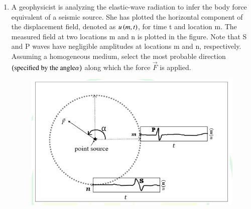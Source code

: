 \documentclass[journal,12pt,onecolumn]{IEEEtran}
\theoremstyle{remark}
\begin{document}
\begin{enumerate}
\item A geophysicist is analyzing the elastic-wave radiation to infer the body force equivalent of a seismic source. She has plotted the horizontal component of the displacement field, denoted as $u\left(m,t\right)$, for time t and location m. The measured field at two locations m and n is plotted in the figure. Note that S and P waves have negligible amplitudes at locations m and n, respectively. Assuming a homogeneous medium, select the most probable direction $\left(\text{specified by the angle} \alpha\right)$ along which the force $\vec{F}$ is applied.
\begin{figure}[H]
    \centering
    \includegraphics[width=0.7\columnwidth]{figs/fig9.png}
    \caption{}
    \label{fig:q47}
\end{figure}
\hfill{}
\begin{enumerate}
\end{enumerate}


\end{enumerate}
\end{document}
